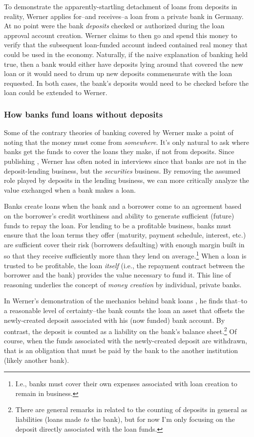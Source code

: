 To demonstrate the apparently-startling detachment of loans from deposits in reality, Werner applies for--and receives--a loan from a private bank in Germany.  At no point were the bank {\it deposits} checked or authorized during the loan approval account creation.  Werner claims to then go and spend this money to verify that the subsequent loan-funded account indeed contained real money that could be used in the economy.  Naturally, if the naive explanation of banking held true, then a bank would either have deposits lying around that covered the new loan or it would need to drum up new deposits commensurate with the loan requested.  In both cases, the bank's deposits would need to be checked before the loan could be extended to Werner.


\subsubsection{How banks fund loans without deposits}

Some of the contrary theories of banking covered by Werner make a point of noting that the money must come from {\it somewhere}.  It's only natural to ask where banks get the funds to cover the loans they make, if not from deposits.  Since publishing \cite{Werner2014}, Werner has often noted  in interviews since that banks are not in the deposit-lending business, but the {\it securities} business.  By removing the assumed role played by deposits in the lending business, we can more critically analyze the value exchanged when a bank makes a loan.  

Banks create loans when the bank and a borrower come to an agreement based on the borrower's credit worthiness and ability to generate sufficient (future) funds to repay the loan.  For lending to be a profitable business, banks must ensure that the loan terms they offer (maturity, payment schedule, interest, etc.) are sufficient cover their risk (borrowers defaulting) with enough margin built in so that they receive sufficiently more than they lend on average.\footnote{I.e., banks must cover their own expenses associated with loan creation to remain in business.}  When a loan is trusted to be profitable, the loan {\it itself} (i.e., the repayment contract between the borrower and the bank) provides the value necessary to fund it.  This line of reasoning underlies the concept of {\it money creation} by individual, private banks.  

In Werner's demonstration of the mechanics behind bank loans \cite{Werner2014}, he finds that--to a reasonable level of certainty--the bank counts the loan an asset that offsets the newly-created deposit associated with his (now funded) bank account.  By contrast, the deposit is counted as a liability on the bank's balance sheet.\footnote{There are general remarks in \cite{Werner2014} related to the counting of deposits in general as liabilities (loans made {\it to} the bank), but for now I'm only focusing on the deposit directly associated with the loan funds.}  Of course, when the funds associated with the newly-created deposit are withdrawn, that is an obligation that must be paid by the bank to the another institution (likely another bank).  



